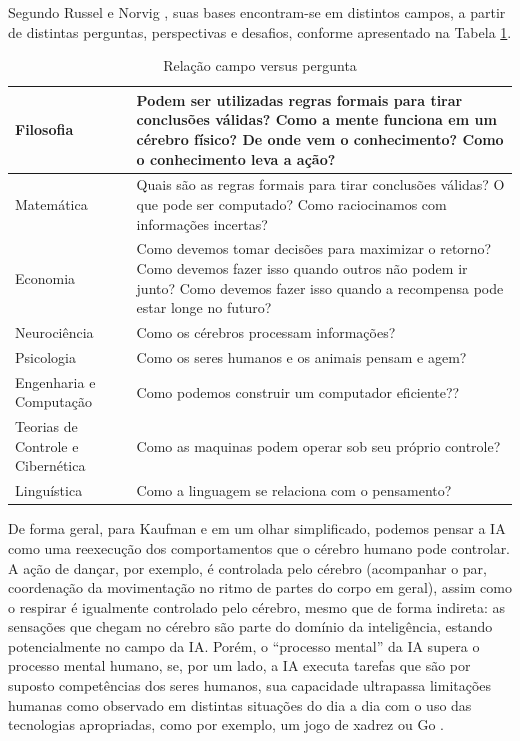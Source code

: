 Segundo Russel e Norvig \cite{russelnorvig}, suas bases encontram-se em distintos campos, a partir de distintas perguntas, perspectivas e desafios, conforme apresentado na Tabela \ref{table:2}.

\begin{table}[h!]
    \centering
    \caption{Relação campo versus pergunta \cite{russelnorvig}}
    \small
    \begin{tabular}{|p{3cm}|p{12cm}|}
        \hline
        Filosofia & Podem ser utilizadas regras formais para tirar conclusões válidas? Como a mente funciona em um cérebro físico? De onde vem o conhecimento? Como o conhecimento leva a ação?\\ 
        \hline
        Matemática & Quais são as regras formais para tirar conclusões válidas? O que pode ser computado? Como raciocinamos com informações incertas?\\
        \hline
        Economia & Como devemos tomar decisões para maximizar o retorno? Como devemos fazer isso quando outros não podem ir junto? Como devemos fazer isso quando a recompensa pode estar longe no futuro?\\
        \hline
        Neurociência & Como os cérebros processam informações?\\
        \hline
        Psicologia & Como os seres humanos e os animais pensam e agem?\\
        \hline
        Engenharia e Computação & Como podemos construir um computador eficiente??\\
        \hline
        Teorias de Controle e Cibernética & Como as maquinas podem operar sob seu próprio controle?\\
        \hline
        Linguística & Como a linguagem se relaciona com o pensamento? \\
        \hline
    \end{tabular}
    \label{table:2}
\end{table}

De forma geral, para Kaufman \cite{kaufman} e em um olhar simplificado, podemos pensar a \acrshort{IA} como uma reexecução dos comportamentos que o cérebro humano pode controlar. A ação de dançar, por exemplo, é controlada pelo cérebro (acompanhar o par, coordenação da movimentação no ritmo de partes do corpo em geral), assim como o respirar é igualmente controlado pelo cérebro, mesmo que de forma indireta: as sensações que chegam no cérebro são parte do domínio da inteligência, estando potencialmente no campo da \acrshort{IA}. Porém, o ``processo mental'' da \acrshort{IA} supera o processo mental humano, se, por um lado, a \acrshort{IA} executa tarefas que são por suposto competências dos seres humanos, sua capacidade ultrapassa limitações humanas como observado em distintas situações do dia a dia com o uso das tecnologias apropriadas, como por exemplo, um jogo de xadrez \cite{xadrez} ou Go \cite{gojogo}. 

